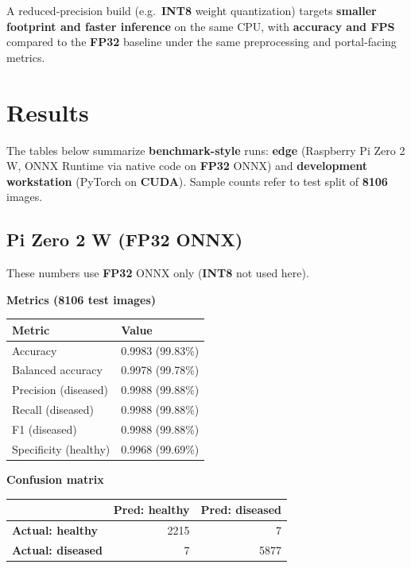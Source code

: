 \documentclass[a4paper,onesided,12pt]{report}
\begin{document}
A reduced-precision build (e.g.\ \textbf{INT8} weight quantization) targets \textbf{smaller footprint and faster inference} on the same CPU, with \textbf{accuracy and FPS} compared to the \textbf{FP32} baseline under the same preprocessing and portal-facing metrics.

\chapter{Results}

The tables below summarize \textbf{benchmark-style} runs: \textbf{edge} (Raspberry Pi Zero 2 W, ONNX Runtime via native code on \textbf{FP32} ONNX) and \textbf{development workstation} (PyTorch on \textbf{CUDA}). Sample counts refer to test split of \textbf{8106} images.

\section{Pi Zero 2 W (FP32 ONNX)}

These numbers use \textbf{FP32} ONNX only (\textbf{INT8} not used here).

\textbf{Metrics (8106 test images)}

\begin{table}[h!]
\begin{center}
\begin{tabular}{|l|l|}
\hline
\textbf{Metric} & \textbf{Value} \\
\hline
Accuracy & 0.9983 (99.83\%) \\
\hline
Balanced accuracy & 0.9978 (99.78\%) \\
\hline
Precision (diseased) & 0.9988 (99.88\%) \\
\hline
Recall (diseased) & 0.9988 (99.88\%) \\
\hline
F1 (diseased) & 0.9988 (99.88\%) \\
\hline
Specificity (healthy) & 0.9968 (99.69\%) \\
\hline
\end{tabular}
\end{center}
\end{table}

\textbf{Confusion matrix}

\begin{table}[h!]
\begin{center}
\begin{tabular}{|l|r|r|}
\hline
 & \textbf{Pred: healthy} & \textbf{Pred: diseased} \\
\hline
\textbf{Actual: healthy} & 2215 & 7 \\
\hline
\textbf{Actual: diseased} & 7 & 5877 \\
\hline
\end{tabular}
\end{center}
\end{table}
\end{document}
